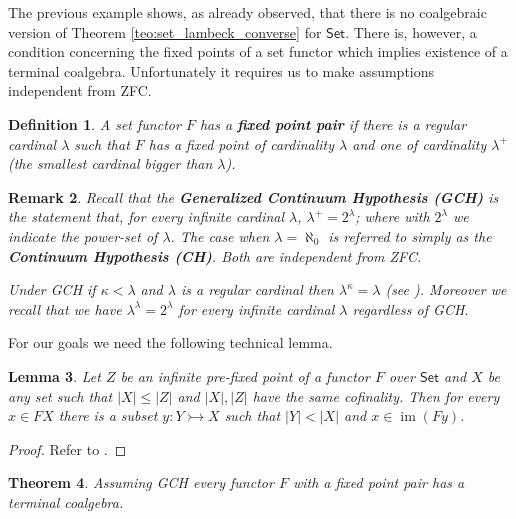 \documentclass[letterpaper, 11pt, oneside]{memoir}
\theoremstyle{myteo}
\newtheorem{theorem}{Theorem}[section]
\newtheorem{lemma}[theorem]{Lemma}
\newtheorem{definition}[theorem]{Definition}
\newtheorem{remark}[theorem]{Remark}
\numberwithin{equation}{section}
\newcommand{\marginnote}[1]{\marginpar{\footnotesize #1}}
\newcommand{\Set}{\textsf{Set}}
\DeclareMathOperator{\im}{im}
\begin{document}
The previous example shows, as already observed, that there is no coalgebraic version of Theorem \ref{teo:set_lambeck_converse} for \(\Set\).
There is, however, a condition concerning the fixed points of a set functor which implies existence of a terminal coalgebra.
Unfortunately it requires us to make assumptions independent from ZFC.

\begin{definition}
  \label{def:fixed-point-pair}
  A set functor \(F\) has a \textbf{fixed point pair}\marginnote{fixed point pair} if there is a regular cardinal \(\lambda\) such that \(F\) has a fixed point of cardinality \(\lambda\) and one of cardinality \(\lambda^+\) (the smallest cardinal bigger than \(\lambda\)).
\end{definition}

\begin{remark}
  \label{rem:gch}
  Recall that the \textbf{Generalized Continuum Hypothesis (GCH)} is the statement that, for every infinite cardinal \(\lambda\), \(\lambda^+ = 2^\lambda\); where with \(2^\lambda\) we indicate the power-set of \(\lambda\).
  The case when \(\lambda = \aleph_0\) is referred to simply as the \textbf{Continuum Hypothesis (CH)}.
  Both are independent from ZFC.
  
  Under GCH if \(\kappa < \lambda\) and \(\lambda\) is a regular cardinal then \(\lambda^\kappa = \lambda\) (see \cite[Theorem 5.15 (iii)]{jech}).
  Moreover we recall that we have \(\lambda^\lambda = 2^\lambda\) for every infinite cardinal \(\lambda\) regardless of GCH.
\end{remark}

For our goals we need the following technical lemma.

\begin{lemma}
  \label{lemma:pseudo-accessability}
  Let \(Z\) be an infinite pre-fixed point of a functor \(F\) over \(\Set\) and \(X\) be any set such that \(|X| \leq |Z|\) and \(|X|, |Z|\) have the same cofinality.
  Then for every \(x \in FX\) there is a subset \(y : Y \rightarrowtail X\) such that \(|Y| < |X|\) and \(x \in \im(Fy)\).
\end{lemma}

\begin{proof}
  Refer to \cite[Lemma B.4.8]{coalgebrabook}.
\end{proof}

\begin{theorem}
  \label{teo:GCH}
  Assuming GCH every functor \(F\) with a fixed point pair has a terminal coalgebra.
\end{theorem}
\end{document}
